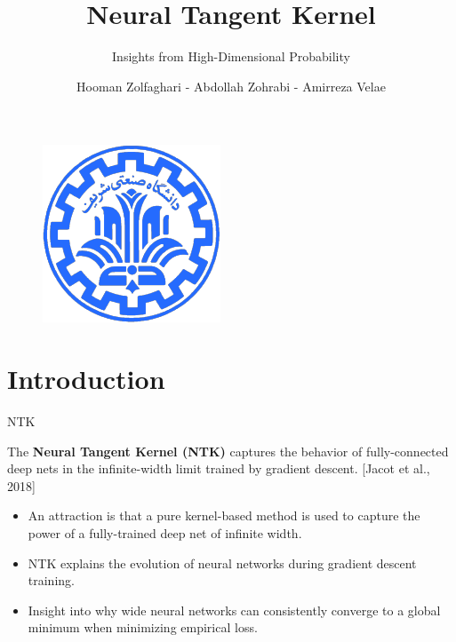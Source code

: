 \documentclass[serif, aspectratio=169]{beamer}
\author{Hooman Zolfaghari - Abdollah Zohrabi - Amirreza Velae}
\title{Neural Tangent Kernel}
\subtitle{Insights from High-Dimensional Probability}
\institute{
    Sharif University of Technology
}
\begin{document}
\begin{frame}
    \titlepage
    \vspace*{-0.6cm}
    \begin{figure}[htpb]
        \begin{center}
            \includegraphics[keepaspectratio, scale=0.25]{pic/sharif-main-logo.png}
        \end{center}
    \end{figure}
\end{frame}

\begin{frame}    
\tableofcontents[sectionstyle=show,
subsectionstyle=show/shaded/hide,
subsubsectionstyle=show/shaded/hide]
\end{frame}

\section{Introduction}

\begin{frame}{NTK}
	
	The \textbf{Neural Tangent Kernel (NTK)} captures the behavior of fully-connected
	deep nets in the infinite-width limit trained by gradient descent. [Jacot et al., 2018]
	
	\begin{itemize}
		\item  An attraction is that a pure
		kernel-based method is used to capture the power of a fully-trained deep net of
		infinite width.
		
		
		\item NTK explains the evolution of neural networks during gradient descent training.
		\item Insight into why wide neural networks can consistently converge to a 
		global minimum when minimizing empirical loss.
	\end{itemize}
\end{frame}
\end{document}
